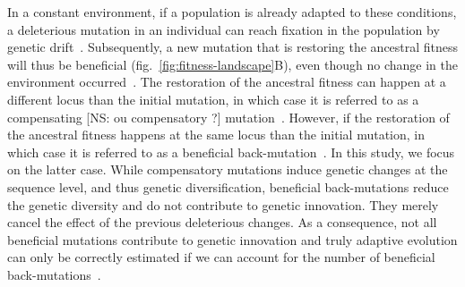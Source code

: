 \documentclass{article}
\begin{document}
    In a constant environment, if a population is already adapted to these conditions, a deleterious mutation in an individual can reach fixation in the population by genetic drift~\cite{Ohta1992}.
    Subsequently, a new mutation that is restoring the ancestral fitness will thus be beneficial (fig.~\ref{fig:fitness-landscape}B), even though no change in the environment occurred~\cite{hartl_compensatory_1996, sella_application_2005, mustonen_fitness_2009, cvijovic_fate_2015}.
    The restoration of the ancestral fitness can happen at a different locus than the initial mutation, in which case it is referred to as a compensating [NS: ou compensatory ?] mutation~\cite{hartl_compensatory_1996, mustonen_fitness_2009}.
    However, if the restoration of the ancestral fitness happens at the same locus than the initial mutation, in which case it is referred to as a beneficial back-mutation~\cite{piganeau_estimating_2003, charlesworth_other_2007}.
    In this study, we focus on the latter case.
    While compensatory mutations induce genetic changes at the sequence level, and thus genetic diversification, beneficial back-mutations reduce the genetic diversity and do not contribute to genetic innovation.
    They merely cancel the effect of the previous deleterious changes.
    As a consequence, not all beneficial mutations contribute to genetic innovation and truly adaptive evolution can only be correctly estimated if we can account for the number of beneficial back-mutations~\cite{keightley_what_2010, rice_evolutionarily_2015}.
\end{document}
